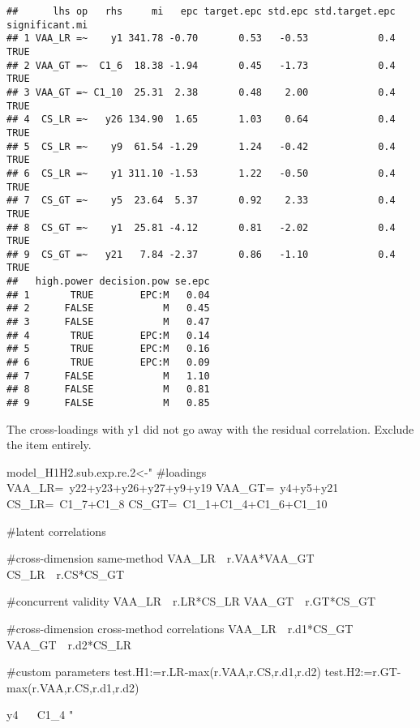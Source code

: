 \documentclass[
]{article}
\newenvironment{Shaded}{\begin{snugshade}}{\end{snugshade}}
\newcommand{\FloatTok}[1]{\textcolor[rgb]{0.00,0.00,0.81}{#1}}
\newcommand{\NormalTok}[1]{#1}
\newcommand{\StringTok}[1]{\textcolor[rgb]{0.31,0.60,0.02}{#1}}
\begin{document}
\begin{verbatim}
##      lhs op   rhs     mi   epc target.epc std.epc std.target.epc significant.mi
## 1 VAA_LR =~    y1 341.78 -0.70       0.53   -0.53            0.4           TRUE
## 2 VAA_GT =~  C1_6  18.38 -1.94       0.45   -1.73            0.4           TRUE
## 3 VAA_GT =~ C1_10  25.31  2.38       0.48    2.00            0.4           TRUE
## 4  CS_LR =~   y26 134.90  1.65       1.03    0.64            0.4           TRUE
## 5  CS_LR =~    y9  61.54 -1.29       1.24   -0.42            0.4           TRUE
## 6  CS_LR =~    y1 311.10 -1.53       1.22   -0.50            0.4           TRUE
## 7  CS_GT =~    y5  23.64  5.37       0.92    2.33            0.4           TRUE
## 8  CS_GT =~    y1  25.81 -4.12       0.81   -2.02            0.4           TRUE
## 9  CS_GT =~   y21   7.84 -2.37       0.86   -1.10            0.4           TRUE
##   high.power decision.pow se.epc
## 1       TRUE        EPC:M   0.04
## 2      FALSE            M   0.45
## 3      FALSE            M   0.47
## 4       TRUE        EPC:M   0.14
## 5       TRUE        EPC:M   0.16
## 6       TRUE        EPC:M   0.09
## 7      FALSE            M   1.10
## 8      FALSE            M   0.81
## 9      FALSE            M   0.85
\end{verbatim}

The cross-loadings with y1 did not go away with the residual
correlation. Exclude the item entirely.

\begin{Shaded}
\begin{Highlighting}[]
\NormalTok{model_H1H2.sub.exp.re}\FloatTok{.2}\NormalTok{<-}\StringTok{"}
\StringTok{#loadings}
\StringTok{VAA_LR=~y22+y23+y26+y27+y9+y19}
\StringTok{VAA_GT=~y4+y5+y21}
\StringTok{CS_LR=~C1_7+C1_8}
\StringTok{CS_GT=~C1_1+C1_4+C1_6+C1_10}

\StringTok{#latent correlations}

\StringTok{#cross-dimension same-method}
\StringTok{VAA_LR~~r.VAA*VAA_GT}
\StringTok{CS_LR~~r.CS*CS_GT}

\StringTok{#concurrent validity}
\StringTok{VAA_LR~~r.LR*CS_LR}
\StringTok{VAA_GT~~r.GT*CS_GT}

\StringTok{#cross-dimension cross-method correlations}
\StringTok{VAA_LR~~r.d1*CS_GT}
\StringTok{VAA_GT~~r.d2*CS_LR}

\StringTok{#custom parameters}
\StringTok{test.H1:=r.LR-max(r.VAA,r.CS,r.d1,r.d2)}
\StringTok{test.H2:=r.GT-max(r.VAA,r.CS,r.d1,r.d2)}

\StringTok{y4  ~~  C1_4}
\StringTok{"}
\end{Highlighting}
\end{Shaded}
\end{document}
